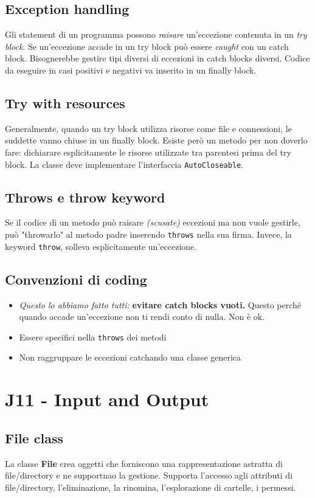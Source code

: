 \documentclass[11pt]{article}
\newcommand{\code}[1]{\texttt{#1}}
\begin{document}
\subsection{Exception handling}
Gli statement di un programma possono \textit{raisare} un'eccezione contenuta in un \textit{try block}. Se un'eccezione accade in un try block può essere \textit{caught} con un catch block. Bisognerebbe gestire tipi diversi di eccezioni in catch blocks diversi. Codice da eseguire in casi positivi e negativi va inserito in un finally block.
\subsection{Try with resources}
Generalmente, quando un try block utilizza risorse come file e connessioni, le suddette vanno chiuse in un finally block. Esiste però un metodo per non doverlo fare: dichiarare esplicitamente le risorse utilizzate tra parentesi prima del try block. La classe deve implementare l'interfaccia \code{AutoCloseable}.
\subsection{Throws e throw keyword}
Se il codice di un metodo può raisare \textit{(scusate)} eccezioni ma non vuole gestirle, può "throwarlo" al metodo padre inserendo \code{throws} nella sua firma. Invece, la keyword \code{throw}, solleva esplicitamente un'eccezione.
\subsection{Convenzioni di coding}
\begin{itemize}
    \item \textit{Questo lo abbiamo fatto tutti:} \textbf{evitare catch blocks vuoti.} Questo perché quando accade un'eccezione non ti rendi conto di nulla. Non è ok.
    \item Essere specifici nella \code{throws} dei metodi 
    \item Non raggruppare le eccezioni catchando una classe generica
\end{itemize}
\section{J11 - Input and Output}
\subsection{File class}
La classe \textbf{File} crea oggetti che forniscono una rappresentazione astratta di file/directory e ne supportnao la gestione. Supporta l'accesso agli attributi di file/directory, l'eliminazione, la rinomina, l'esplorazione di cartelle, i permessi.
\end{document}
